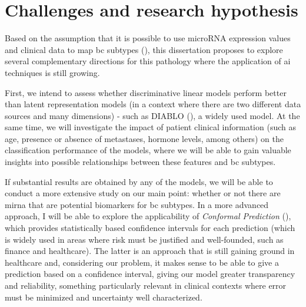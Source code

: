 \section{Challenges and research hypothesis}
\label{sec:challenges+research-hypothesis}
Based on the assumption that it is possible to use microRNA expression values
and clinical data to map \gls{bc} subtypes
(\textcites{mirna_as_biomarkers_Ho2022}{mirnas_in_bc_Muñoz2023}), this dissertation
proposes to explore several complementary directions for this pathology where
the application of \gls{ai} techniques is still growing.

First, we intend to assess whether discriminative linear models perform better
than latent representation models (in a context where there are two different
data sources and many dimensions) - such as DIABLO
(\textcite{DIABLO_Singh2019}), a widely used model. At the same time, we will
investigate the impact of patient clinical information (such as age, presence
or absence of metastases, hormone levels, among others) on the classification
performance of the models, where we will be able to gain valuable insights into
possible relationships between these features and \gls{bc} subtypes.

If substantial results are obtained by any of the models, we will be able to
conduct a more extensive study on our main point: whether or not there are
\gls{mirna} that are potential biomarkers for \gls{bc} subtypes. In a more
advanced approach, I will be able to explore the applicability of
\textit{Conformal Prediction}
(\textcite{conformal_prediction_Angelopoulos2023}), which provides
statistically based confidence intervals for each prediction (which is widely
used in areas where risk must be justified and well-founded, such as finance
and healthcare). The latter is an approach that is still gaining ground in
healthcare and, considering our problem, it makes sense to be able to give a
prediction based on a confidence interval, giving our model greater
transparency and reliability, something particularly relevant in clinical
contexts where error must be minimized and uncertainty well characterized.

